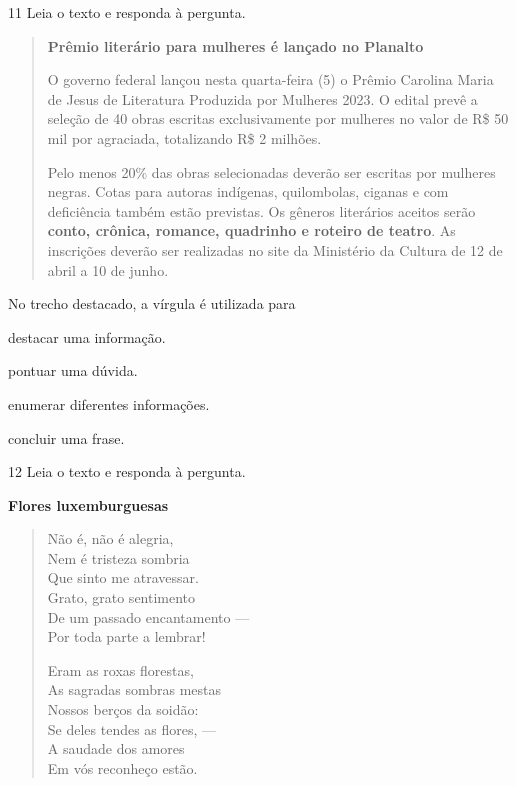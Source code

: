 \num{11} Leia o texto e responda à pergunta.

\begin{quote}
\textbf{Prêmio literário para mulheres é lançado no Planalto}

O governo federal lançou nesta quarta-feira (5) o Prêmio Carolina Maria
de Jesus de Literatura Produzida por Mulheres 2023. O edital prevê a
seleção de 40 obras escritas exclusivamente por mulheres no valor de R\$
50 mil por agraciada, totalizando R\$ 2 milhões.

Pelo menos 20\% das obras selecionadas deverão ser escritas por mulheres
negras. Cotas para autoras indígenas, quilombolas, ciganas e com
deficiência também estão previstas. Os gêneros literários aceitos serão
\textbf{conto, crônica, romance, quadrinho e roteiro de teatro}. As
inscrições deverão ser realizadas no site da Ministério da Cultura de 12
de abril a 10 de junho.
\end{quote}


No trecho destacado, a vírgula é utilizada para

\begin{escolha}
  \item destacar uma informação.

  \item pontuar uma dúvida.

  \item enumerar diferentes informações.

  \item concluir uma frase.
\end{escolha}

\num{12} Leia o texto e responda à pergunta.

\textbf{Flores luxemburguesas}

\begin{verse}
Não é, não é alegria,\\
Nem é tristeza sombria\\
Que sinto me atravessar.\\
Grato, grato sentimento\\
De um passado encantamento ---\\
Por toda parte a lembrar!

Eram as roxas florestas,\\
As sagradas sombras mestas\\
Nossos berços da soidão:\\
Se deles tendes as flores, ---\\
A saudade dos amores\\
Em vós reconheço estão.
\end{verse}

